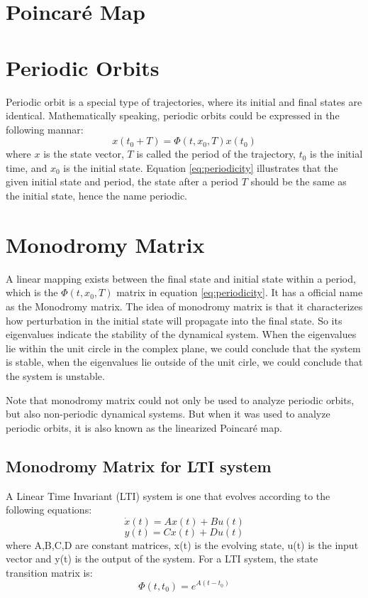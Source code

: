 \section{Poincar\'e Map}
\label{sec:Poincare}

\section{Periodic Orbits}
\label{sec:periodic}

Periodic orbit is a special type of trajectories, where its initial and final states are identical. Mathematically speaking, periodic orbits could be expressed in the following mannar:
\begin{equation}
\label{eq:periodicity}
x(t_0+T) = \Phi(t,x_0,T)x(t_0)
\end{equation}
where $x$ is the state vector, $T$ is called the period of the trajectory, $t_0$ is the initial time, and $x_0$ is the initial state. Equation \ref{eq:periodicity} illustrates that the given initial state and period, the state after a period $T$ should be the same as the initial state, hence the name periodic.

\section{Monodromy Matrix}
\label{sec:monodromy}
A linear mapping exists between the final state and initial state within a period, which is the $\Phi(t,x_0,T)$ matrix in equation \ref{eq:periodicity}. It has a official name as the Monodromy matrix. The idea of monodromy matrix is that it characterizes how perturbation in the initial state will propagate into the final state. So its eigenvalues indicate the stability of the dynamical system. When the eigenvalues lie within the unit circle in the complex plane, we could conclude that the system is stable, when the eigenvalues lie outside of the unit cirle, we could conclude that the system is unstable.

Note that monodromy matrix could not only be used to analyze periodic orbits, but also non-periodic dynamical systems. But when it was used to analyze periodic orbits, it is also known as the linearized Poincar\'e map.

\subsection{Monodromy Matrix for LTI system}

A Linear Time Invariant (LTI) system is one that evolves according to the following equations:
\begin{equation}
	\dot{x}(t) = Ax(t)+Bu(t)
\end{equation}
\begin{equation}
	y(t) = Cx(t)+Du(t)
\end{equation}
where A,B,C,D are constant matrices, x(t) is the evolving state, u(t) is the input vector and y(t) is the output of the system.
For a LTI system, the state transition matrix is:
\begin{equation}
	\Phi(t,t_0) = e^{A(t-t_0)}
\end{equation}



